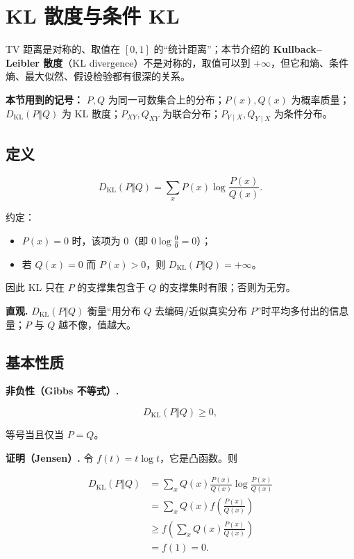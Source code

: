 \section{KL 散度与条件 KL}


TV 距离是对称的、取值在 $[0,1]$ 的“统计距离”；本节介绍的 \textbf{Kullback–Leibler 散度}（KL divergence）不是对称的，取值可以到 $+\infty$，但它和熵、条件熵、最大似然、假设检验都有很深的关系。

\textbf{本节用到的记号：} $P,Q$ 为同一可数集合上的分布；$P(x),Q(x)$ 为概率质量；$D_{\mathrm{KL}}(P\Vert Q)$ 为 KL 散度；$P_{XY},Q_{XY}$ 为联合分布；$P_{Y\mid X},Q_{Y\mid X}$ 为条件分布。

\subsection{定义}


\[
\boxed{
D_{\mathrm{KL}}(P\Vert Q)
=\sum_xP(x)\log\frac{P(x)}{Q(x)}
}.
\]

约定：

\begin{itemize}
\item $P(x)=0$ 时，该项为 $0$（即 $0\log\frac00=0$）；
\item 若 $Q(x)=0$ 而 $P(x)>0$，则 $D_{\mathrm{KL}}(P\Vert Q)=+\infty$。
\end{itemize}


因此 KL 只在 $P$ 的支撑集包含于 $Q$ 的支撑集时有限；否则为无穷。

\textbf{直观.} $D_{\mathrm{KL}}(P\Vert Q)$ 衡量“用分布 $Q$ 去编码/近似真实分布 $P$”时平均多付出的信息量；$P$ 与 $Q$ 越不像，值越大。

\subsection{基本性质}


\textbf{非负性（Gibbs 不等式）.}

\[
D_{\mathrm{KL}}(P\Vert Q)\ge0,
\]

等号当且仅当 $P=Q$。

\textbf{证明（Jensen）.} 令 $f(t)=t\log t$，它是凸函数。则

\[
\begin{aligned}
D_{\mathrm{KL}}(P\Vert Q)
&=\sum_xQ(x)\frac{P(x)}{Q(x)}
\log\frac{P(x)}{Q(x)}\\
&=\sum_xQ(x)f\left(\frac{P(x)}{Q(x)}\right)\\
&\ge f\left(\sum_xQ(x)\frac{P(x)}{Q(x)}\right)\\
&=f(1)=0.
\end{aligned}
\]

